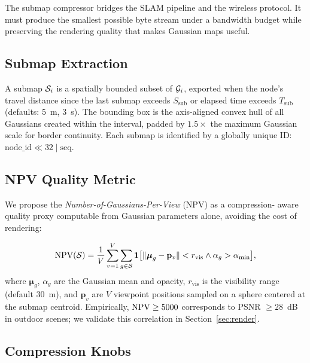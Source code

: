 \label{sec:compression}

The submap compressor bridges the SLAM pipeline and the wireless protocol.
It must produce the smallest possible byte stream under a bandwidth budget
while preserving the rendering quality that makes Gaussian maps useful.

\subsection{Submap Extraction}

A submap $\mathcal{S}_i$ is a spatially bounded subset of $\mathcal{G}_i$,
exported when the node's travel distance since the last submap exceeds
$S_{\text{sub}}$ or elapsed time exceeds $T_{\text{sub}}$ (defaults: 5~m,
3~s). The bounding box is the axis-aligned convex hull of all Gaussians
created within the interval, padded by $1.5\times$ the maximum Gaussian
scale for border continuity. Each submap is identified by a globally unique
ID: $\text{node\_id}\ll 32\mid\text{seq}$.

\subsection{NPV Quality Metric}

\label{sec:npv}

We propose the \emph{Number-of-Gaussians-Per-View} (NPV) as a compression-
aware quality proxy computable from Gaussian parameters alone, avoiding
the cost of rendering:

\begin{equation}
  \text{NPV}(\mathcal{S}) = \frac{1}{V}\sum_{v=1}^{V}\sum_{g\in\mathcal{S}}
    \mathbf{1}\bigl[\|\boldsymbol{\mu}_g-\mathbf{p}_v\|<r_{\text{vis}}
    \land \alpha_g>\alpha_{\min}\bigr],
\end{equation}
where $\boldsymbol{\mu}_g$, $\alpha_g$ are the Gaussian mean and opacity,
$r_{\text{vis}}$ is the visibility range (default 30~m), and $\mathbf{p}_v$
are $V$ viewpoint positions sampled on a sphere centered at the submap
centroid. Empirically, $\text{NPV}\ge 5000$ corresponds to PSNR $\ge 28$~dB in
outdoor scenes; we validate this correlation in Section~\ref{sec:render}.

\subsection{Compression Knobs}

